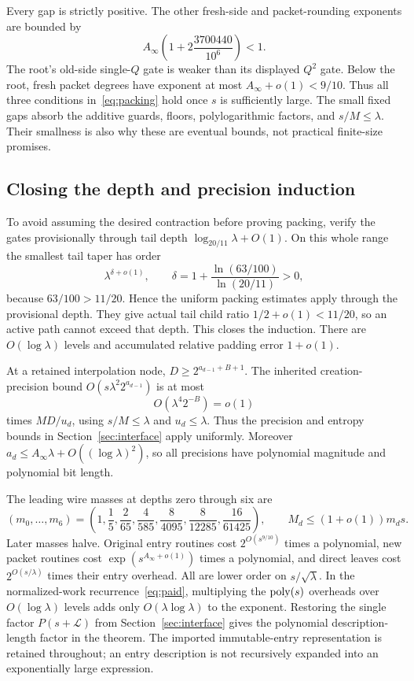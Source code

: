 Every gap is strictly positive. The other fresh-side and packet-rounding
exponents are bounded by
\[
 A_\infty\left(1+2\frac{3700440}{10^6}\right)<1.
\]
The root's old-side single-$Q$ gate is weaker than its displayed $Q^2$
gate. Below the root, fresh packet degrees have exponent at most
$A_\infty+o(1)<9/10$. Thus all three conditions in~\eqref{eq:packing}
hold once $s$ is sufficiently large. The small fixed gaps absorb the
additive guards, floors, polylogarithmic factors, and $s/M\le\lambda$.
Their smallness is also why these are eventual bounds, not practical
finite-size promises.

\subsection{Closing the depth and precision induction}

To avoid assuming the desired contraction before proving packing, verify
the gates provisionally through tail depth
$\log_{20/11}\lambda+O(1)$. On this whole range the smallest tail taper
has order
\[
 \lambda^{\delta+o(1)},\qquad
 \delta=1+\frac{\ln(63/100)}{\ln(20/11)}>0,
\]
because $63/100>11/20$. Hence the uniform packing estimates apply through
the provisional depth. They give actual tail child ratio
$1/2+o(1)<11/20$, so an active path cannot exceed that depth. This closes
the induction. There are $O(\log\lambda)$ levels and accumulated relative
padding error $1+o(1)$.

At a retained interpolation node,
$D\ge2^{a_{d-1}+B+1}$. The inherited creation-precision bound
$O(s\lambda^2 2^{a_{d-1}})$ is at most
\[
 O(\lambda^4 2^{-B})=o(1)
\]
times $MD/u_d$, using $s/M\le\lambda$ and $u_d\le\lambda$.
Thus the precision and entropy bounds in Section~\ref{sec:interface}
apply uniformly. Moreover
$a_d\le A_\infty\lambda+O((\log\lambda)^2)$, so all precisions have
polynomial magnitude and polynomial bit length.

The leading wire masses at depths zero through six are
\begin{equation}\label{eq:masses}
 (m_0,\ldots,m_6)
 =\left(1,\frac15,\frac2{65},\frac4{585},
          \frac8{4095},\frac8{12285},\frac{16}{61425}\right),
 \qquad M_d\le(1+o(1))m_ds.
\end{equation}
Later masses halve. Original entry routines cost
$2^{O(s^{9/10})}$ times a polynomial, new packet routines cost
$\exp(s^{A_\infty+o(1)})$ times a polynomial, and direct leaves cost
$2^{O(s/\lambda)}$ times their entry overhead. All are lower order on
$s/\sqrt\lambda$. In the normalized-work recurrence~\eqref{eq:paid},
multiplying the $\operatorname{poly}(s)$ overheads over
$O(\log\lambda)$ levels adds only $O(\lambda\log\lambda)$ to the
exponent. Restoring the single factor $P(s+\mathcal L)$ from
Section~\ref{sec:interface} gives the polynomial description-length
factor in the theorem. The imported immutable-entry representation is retained
throughout; an entry description is not recursively expanded into an
exponentially large expression.

